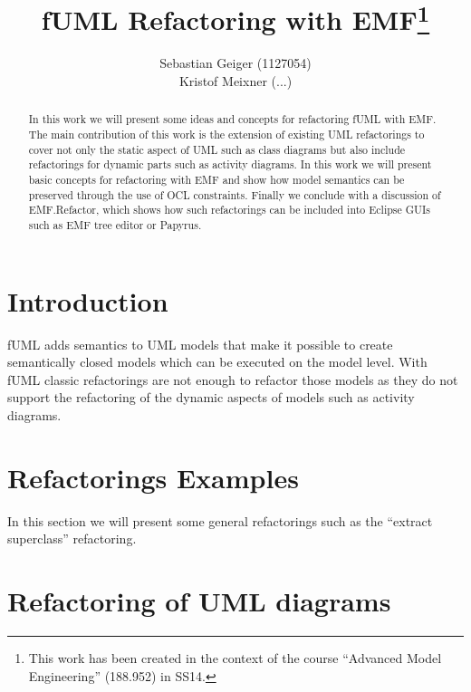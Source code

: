 \documentclass[a4paper,10pt]{article}
\begin{document}

\twocolumn

\title{fUML Refactoring with EMF\footnote{This work has been created in the context of the course ``Advanced Model Engineering'' (188.952) in SS14.}}
\author{Sebastian Geiger (1127054) \\ Kristof Meixner (...)}

\maketitle

\begin{abstract}
In this work we will present some ideas and concepts for refactoring fUML with EMF. The main contribution of this work is the extension of
existing UML refactorings to cover not only the static aspect of UML such as class diagrams but also include refactorings for dynamic
parts such as activity diagrams. In this work we will present basic concepts for refactoring with EMF and show how model semantics can be
preserved through the use of OCL constraints. Finally we conclude with a discussion of EMF.Refactor, which shows how such refactorings
can be included into Eclipse GUIs such as EMF tree editor or Papyrus.
\end{abstract}

\section{Introduction}
fUML adds semantics to UML models that make it possible to create semantically closed models which can be executed on the model level. With
fUML classic refactorings are not enough to refactor those models as they do not support the refactoring of the dynamic aspects of models
such as activity diagrams.

\section{Refactorings Examples}
In this section we will present some general refactorings such as the ``extract superclass'' refactoring.

\section{Refactoring of UML diagrams}
\end{document}

